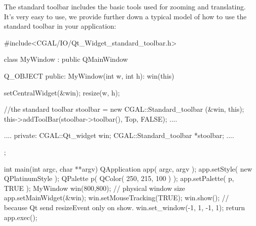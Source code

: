 The standard toolbar includes the basic tools used for zooming and translating.
It's very easy to use, we provide further down a typical model of how to use 
the standard toolbar in your application:

\begin{ccExampleCode}
#include<CGAL/IO/Qt_Widget_standard_toolbar.h>

class MyWindow : public QMainWindow
{
  Q_OBJECT
public:
  MyWindow(int w, int h): win(this) {
    setCentralWidget(&win);
    resize(w, h);
    
    //the standard toolbar
    stoolbar = new CGAL::Standard_toolbar (&win, this);
    this->addToolBar(stoolbar->toolbar(), Top, FALSE);
   ....
  }
  ....
private:
  CGAL::Qt_widget	  win;
  CGAL::Standard_toolbar  *stoolbar;
  ....
};

int
main(int argc, char **argv)
{
  QApplication app( argc, argv );
    app.setStyle( new QPlatinumStyle );
    QPalette p( QColor( 250, 215, 100 ) );
    app.setPalette( p, TRUE );
  MyWindow win(800,800); // physical window size
  app.setMainWidget(&win);
  win.setMouseTracking(TRUE);
  win.show();
  // because Qt send resizeEvent only on show.
  win.set_window(-1, 1, -1, 1);
  return app.exec();
}
\end{ccExampleCode}










